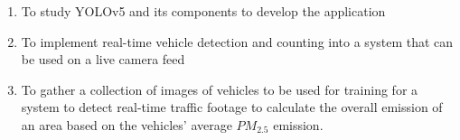 \begin{comment}
How to formulate your research objectives:
1. Identify what research steps do you need to perform to achieve your general objective.
2. Identify the questions that must be answered for you to achieve your general objective.
    Thereafter, convert these questions into action statements

Example #1:

Research Question:
  What are the general features of a web-based learning environment?

Specific Objective:
   To review existing web-based learning environment that teaches language learning for children


Example #2:

Research Question:
   How will you represent commonsense knowledge for use by computer systems?

Specific Objective:
   To identify knowledge representation approaches used by existing story generation systems

Example #3:
Research Question:
   What types of storytelling knowledge are needed to generate stories?

Specific Objective:
    To identify the different types of storytelling knowledge used in generating stories

Example #4:
Research Question:
    What machine learning approaches will you utilize?

Specific Objective:
    To determine existing machine learning algorithms [that can be used in training the computer system to detect cyberbullying cases] 

Example #5: Research Question:
    How will your research output be evaluated?

Specific Objective:
    To define evaluation metrics for validating the accuracy of the translation

\end{comment}

%
%

\begin{enumerate}
   
   \item To study YOLOv5 and its components to develop the application
   \item To implement real-time vehicle detection and counting into a system that can be used on a live camera feed
   \item To gather a collection of images of vehicles to be used for training for a system to detect real-time traffic footage to calculate the overall emission of an area based on the vehicles' average $PM_{2.5}$ emission.

\end{enumerate}


